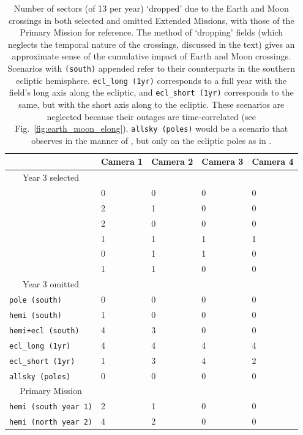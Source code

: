 \begin{table}[!tb]
	\centering
	\begin{tabular}{ | l | l | l | l | l | }
		\hline
		\ & Camera 1 & Camera 2 & Camera 3 & Camera 4 \\ \hline
		\multicolumn{1}{|c|}{Year 3 selected} & \  & \  & \  & \  \\ \hline
		\npole & 0 & 0 & 0 & 0 \\ \hline
		\nhemi & 2 & 1 & 0 & 0 \\ \hline
		\shemiAvoid & 2 & 0 & 0 & 0 \\ \hline
		\elong & 1 & 1 & 1 & 1 \\ \hline
		\eshort & 0 & 1 & 1 & 0 \\ \hline
		\hemis & 1 & 1 & 0 & 0 \\ \hline
		\multicolumn{1}{|c|}{Year 3 omitted} & \  & \  & \  & \  \\ \hline
		\texttt{pole\,(south)}  & 0 & 0 & 0 & 0 \\ \hline
		\texttt{hemi\,(south)} & 1 & 0 & 0 & 0 \\ \hline
		\texttt{hemi+ecl\,(south)} & 4 & 3 & 0 & 0 \\ \hline
		\texttt{ecl\_long\,(1yr)} & 4 & 4 & 4 & 4 \\ \hline
		\texttt{ecl\_short\,(1yr)} & 1 & 3 & 4 & 2 \\ \hline
		\texttt{allsky\,(poles)} & 0 & 0 & 0 & 0 \\ \hline
		\multicolumn{1}{|c|}{Primary Mission} & \  & \  & \  & \  \\ \hline
		\texttt{hemi\,(south year 1)} & 2 & 1 & 0 & 0 \\ \hline
		\texttt{hemi\,(north year 2)} & 4 & 2 & 0 & 0 \\ \hline
	\end{tabular}
	\caption{Number of sectors (of 13 per year) `dropped' due to the Earth and 
	Moon crossings in both selected and omitted Extended Missions, with those 
	of the Primary Mission for reference. The method of `dropping' fields 
	(which neglects the temporal nature of the crossings, discussed in the 
	text) gives an approximate sense of the cumulative impact of Earth and Moon 
	crossings. 
		Scenarios with \texttt{(south)} appended refer to their counterparts in the southern ecliptic hemisphere.
		\texttt{ecl\_long\,(1yr)} corresponds to a full year with the \tess field's long axis along the ecliptic, and \texttt{ecl\_short\,(1yr)} corresponds to the same, but with the short axis along to the ecliptic. These scenarios are neglected because their outages are time-correlated (see Fig.~\protect\ref{fig:earth_moon_elong}).
		\texttt{allsky\,(poles)} would be a scenario that observes in the manner of \hemis, but only on the ecliptic poles as in \npole.}
	\label{tab:dropped_fields}
\end{table}



